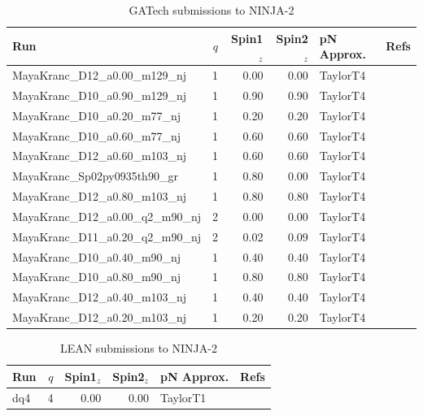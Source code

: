 \begin{table}
\begin{center}
\begin{tabular}{|l|r|r|r|l|c|}
\hline
Run & $q$ & Spin1${}_z$ & Spin2${}_z$ & pN Approx. & Refs \\
\hline
MayaKranc\_D12\_a0.00\_m129\_nj & 1 & 0.00 & 0.00 & TaylorT4 &
\cite{Herrmann2007b,MRS:2010} \\
MayaKranc\_D10\_a0.90\_m129\_nj & 1 & 0.90 & 0.90 & TaylorT4 & \cite{Herrmann2007b,MRS:2010} \\
MayaKranc\_D10\_a0.20\_m77\_nj & 1 & 0.20 & 0.20 & TaylorT4 & \cite{Herrmann2007b,MRS:2010} \\
MayaKranc\_D10\_a0.60\_m77\_nj & 1 & 0.60 & 0.60 & TaylorT4 & \cite{Herrmann2007b,MRS:2010} \\
MayaKranc\_D12\_a0.60\_m103\_nj & 1 & 0.60 & 0.60 & TaylorT4 & \cite{Herrmann2007b,MRS:2010} \\
MayaKranc\_Sp02py0935th90\_gr & 1 & 0.80 & 0.00 & TaylorT4 & \cite{Herrmann2007b,MRS:2010} \\
MayaKranc\_D12\_a0.80\_m103\_nj & 1 & 0.80 & 0.80 & TaylorT4 & \cite{Herrmann2007b,MRS:2010} \\
MayaKranc\_D12\_a0.00\_q2\_m90\_nj & 2 & 0.00 & 0.00 & TaylorT4 &
\cite{Herrmann2007b,MRS:2010} \\
MayaKranc\_D11\_a0.20\_q2\_m90\_nj & 2 & 0.02 & 0.09 & TaylorT4 &
\cite{Herrmann2007b,MRS:2010} \\
MayaKranc\_D10\_a0.40\_m90\_nj & 1 & 0.40 & 0.40 & TaylorT4 & \cite{Herrmann2007b,MRS:2010} \\
MayaKranc\_D10\_a0.80\_m90\_nj & 1 & 0.80 & 0.80 & TaylorT4 & \cite{Herrmann2007b,MRS:2010} \\
MayaKranc\_D12\_a0.40\_m103\_nj & 1 & 0.40 & 0.40 & TaylorT4 & \cite{Herrmann2007b,MRS:2010} \\
MayaKranc\_D12\_a0.20\_m103\_nj & 1 & 0.20 & 0.20 & TaylorT4 & \cite{Herrmann2007b,MRS:2010} \\
\hline
\end{tabular}
\end{center}
\caption[GATech submissions to NINJA-2]{
\label{tab:ninja2_gatech}
GATech submissions to NINJA-2}
\end{table}

\begin{table}
\begin{center}
\begin{tabular}{|l|r|r|r|l|c|}
\hline
Run & $q$ & Spin1${}_z$ & Spin2${}_z$ & pN Approx. & Refs \\
\hline
dq4 & 4 & 0.00 & 0.00 & TaylorT1 & \cite{Sperhake:2006cy} \\
\hline
\end{tabular}
\end{center}
\caption[LEAN submissions to NINJA-2]{
\label{tab:ninja2_lean}
LEAN submissions to NINJA-2}
\end{table}

